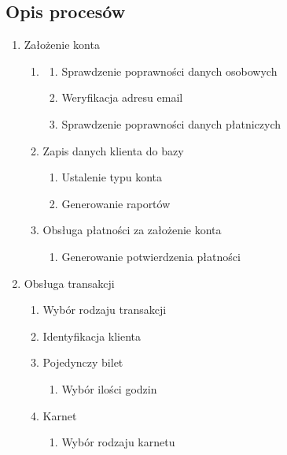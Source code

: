 \documentclass[a4paper,11pt]{article}
\begin{document}
\subsection{Opis procesów}
\begin{enumerate}
    \item Założenie konta
        \begin{enumerate}
            \item {}
                \begin{enumerate}
                    \item Sprawdzenie poprawności danych osobowych
                    \item Weryfikacja adresu email
                    \item Sprawdzenie poprawności danych płatniczych
                \end{enumerate}
            \item Zapis danych klienta do bazy
                \begin{enumerate}
                    \item Ustalenie typu konta
                    \item Generowanie raportów
                \end{enumerate}
            \item Obsługa płatności za założenie konta
                \begin{enumerate}
                    \item Generowanie potwierdzenia płatności
                \end{enumerate}
        \end{enumerate}
    \item Obsługa transakcji
        \begin{enumerate}
            \item Wybór rodzaju transakcji
            \item Identyfikacja klienta
            \item Pojedynczy bilet
                \begin{enumerate}
                    \item Wybór ilości godzin
                \end{enumerate}
            \item Karnet
                \begin{enumerate}
                    \item Wybór rodzaju karnetu
                \end{enumerate}

\end{enumerate}
\end{enumerate}
\end{document}
